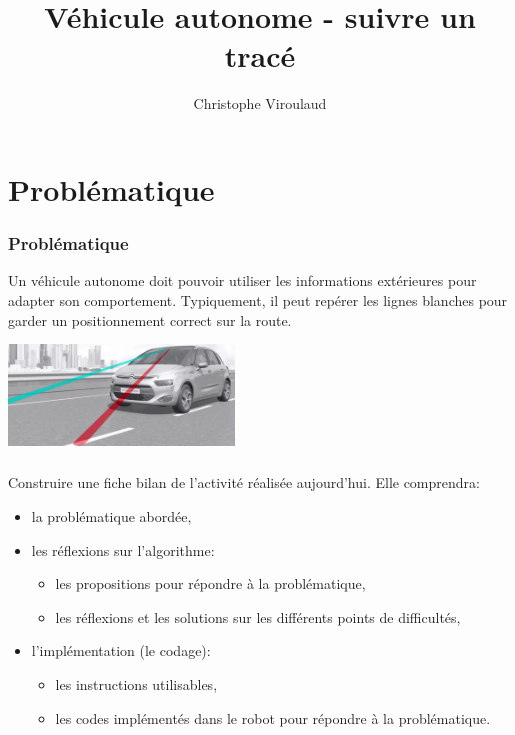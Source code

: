 \documentclass[svgnames,11pt]{beamer}
\author[]{Christophe Viroulaud}
\title{Véhicule autonome - suivre un tracé}
\date{}
\institute{Seconde - SNT}
\begin{document}
\begin{frame}
\titlepage
\end{frame}


\section{Problématique}
\begin{frame}
    \frametitle{Problématique}

    Un véhicule autonome doit pouvoir utiliser les informations extérieures pour adapter son comportement. Typiquement, il peut repérer les lignes blanches pour garder un positionnement correct sur la route.
\begin{center}
\centering
\includegraphics[width=6cm]{ressources/lignes.png}
\label{lignes}
\end{center}

\end{frame}

\begin{frame}
    \frametitle{}

    \begin{center}
    \end{center}

\end{frame}
\begin{frame}
    \frametitle{}

    \begin{activite}
    Construire une fiche bilan de l'activité réalisée aujourd'hui. Elle comprendra:
    \begin{itemize}
        \item la problématique abordée,
        \item les réflexions sur l'algorithme:
        \begin{itemize}
            \item les propositions pour répondre à la problématique,
            \item les réflexions et les solutions sur les différents points de difficultés,
        \end{itemize}
        \item l'implémentation (le codage):
        \begin{itemize}
            \item les instructions utilisables,
            \item les codes implémentés dans le robot pour répondre à la problématique.
        \end{itemize}
    \end{itemize}
    \end{activite}
\end{frame}
\end{document}
